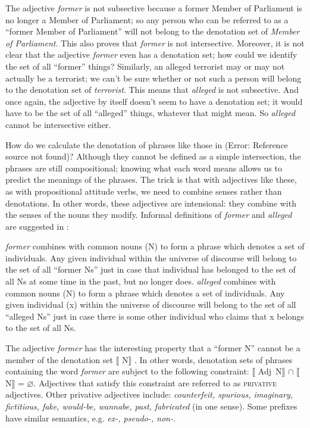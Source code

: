 The adjective \textit{former} is not subsective because a former Member of Parliament is no longer a Member of Parliament; so any person who can be referred to as a “former Member of Parliament” will not belong to the denotation set of \textit{Member of Parliament}. This also proves that \textit{former} is not intersective. Moreover, it is not clear that the adjective \textit{former} even has a denotation set; how could we identify the set of all “former” things? Similarly, an alleged terrorist may or may not actually be a terrorist; we can’t be sure whether or not such a person will belong to the denotation set of \textit{terrorist}. This means that \textit{alleged} is not subsective. And once again, the adjective by itself doesn’t seem to have a denotation set; it would have to be the set of all “alleged” things, whatever that might mean. So \textit{alleged} cannot be intersective either.



How do we calculate the denotation of phrases like those in (Error: Reference source not found)? Although they cannot be defined as a simple intersection, the phrases are still compositional; knowing what each word means allows us to predict the meanings of the phrases. The trick is that with adjectives like these, as with propositional attitude verbs, we need to combine senses rather than denotations. In other words, these adjectives are intensional: they combine with the senses of the nouns they modify. Informal definitions of \textit{former} and \textit{alleged} are suggested in :


\ea \label{ex:15.11}
\ea \label{ex:15.}  \textit{former} combines with common nouns (N) to form a phrase which denotes a set of individuals. Any given individual within the universe of discourse will belong to the set of all “former Ns” just in case that individual has belonged to the set of all Ns at some time in the past, but no longer does.
\ex  \textit{alleged} combines with common nouns (N) to form a phrase which denotes a set of individuals. Any given individual (x) within the universe of discourse will belong to the set of all “alleged Ns” just in case there is some other individual who claims that x belongs to the set of all Ns.
\z \z


The adjective \textit{former} has the interesting property that a “former N” cannot be a member of the denotation set $\llbracket$ N$\rrbracket$ . In other words, denotation sets of phrases containing the word \textit{former} are subject to the following constraint: $\llbracket$ Adj~N$\rrbracket$  ${\cap}$ $\llbracket$ N$\rrbracket$  = ⌀. Adjectives that satisfy this constraint are referred to as \textsc{privative} adjectives. Other privative adjectives include: \textit{counterfeit, spurious, imaginary, fictitious, fake, would-be, wannabe, past, fabricated} (in one sense). Some prefixes have similar semantics, e.g. \textit{ex-, pseudo-, non-}.



